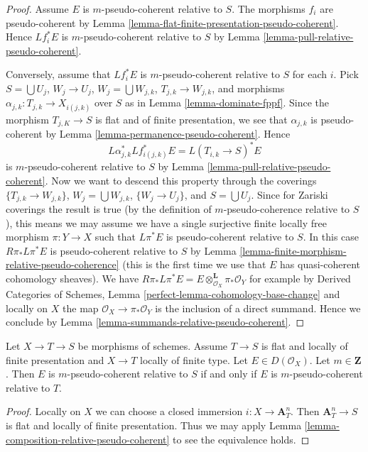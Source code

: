 \begin{proof}
Assume $E$ is $m$-pseudo-coherent relative to $S$.
The morphisms $f_i$ are pseudo-coherent by
Lemma \ref{lemma-flat-finite-presentation-pseudo-coherent}.
Hence $Lf_i^*E$ is $m$-pseudo-coherent relative to $S$
by Lemma \ref{lemma-pull-relative-pseudo-coherent}.

\medskip\noindent
Conversely, assume that $Lf_i^*E$ is $m$-pseudo-coherent relative to $S$
for each $i$. Pick $S = \bigcup U_j$, $W_j \to U_j$,
$W_j = \bigcup W_{j, k}$, $T_{j, k} \to W_{j, k}$, and
morphisms $\alpha_{j, k} : T_{j, k} \to X_{i(j, k)}$ over $S$ as in
Lemma \ref{lemma-dominate-fppf}.
Since the morphism $T_{j, K} \to S$ is flat and of finite presentation,
we see that $\alpha_{j, k}$ is pseudo-coherent by
Lemma \ref{lemma-permanence-pseudo-coherent}.
Hence
$$
L\alpha_{j, k}^*Lf_{i(j, k)}^*E = L(T_{i, k} \to S)^*E
$$
is $m$-pseudo-coherent relative to $S$ by
Lemma \ref{lemma-pull-relative-pseudo-coherent}.
Now we want to descend this property
through the coverings $\{T_{j, k} \to W_{j, k}\}$,
$W_j = \bigcup W_{j, k}$, $\{W_j \to U_j\}$, and $S = \bigcup U_j$.
Since for Zariski coverings the result is true
(by the definition of $m$-pseudo-coherence relative to $S$),
this means we may assume we have a single surjective
finite locally free morphism $\pi : Y \to X$
such that $L\pi^*E$ is pseudo-coherent relative to $S$.
In this case $R\pi_*L\pi^*E$ is pseudo-coherent relative to $S$
by Lemma \ref{lemma-finite-morphism-relative-pseudo-coherence}
(this is the first time we use that $E$ has quasi-coherent cohomology sheaves).
We have
$R\pi_*L\pi^*E = E \otimes^\mathbf{L}_{\mathcal{O}_X} \pi_*\mathcal{O}_Y$
for example by
Derived Categories of Schemes, Lemma
\ref{perfect-lemma-cohomology-base-change}
and locally on $X$ the map $\mathcal{O}_X \to \pi_*\mathcal{O}_Y$
is the inclusion of a direct summand. Hence we conclude by
Lemma \ref{lemma-summands-relative-pseudo-coherent}.
\end{proof}

\begin{lemma}
\label{lemma-relative-pseudo-coherent-post-compose}
Let $X \to T \to S$ be morphisms of schemes. Assume $T \to S$
is flat and locally of finite presentation and $X \to T$
locally of finite type. Let $E \in D(\mathcal{O}_X)$. Let $m \in \mathbf{Z}$.
Then $E$ is $m$-pseudo-coherent relative to $S$
if and only if $E$ is $m$-pseudo-coherent relative to $T$.
\end{lemma}

\begin{proof}
Locally on $X$ we can choose a closed immersion $i : X \to \mathbf{A}^n_T$.
Then $\mathbf{A}^n_T \to S$ is flat and locally of finite presentation.
Thus we may
apply Lemma \ref{lemma-composition-relative-pseudo-coherent}
to see the equivalence holds.
\end{proof}

